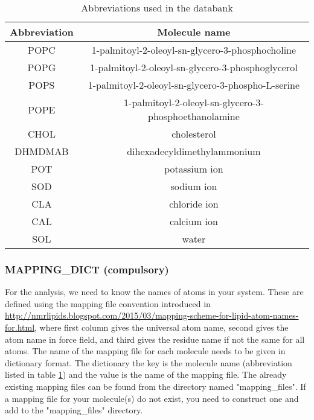\documentclass[fleqn,10pt]{wlscirep}
\begin{document}
\begin{table}[h]
    \centering
    \begin{tabular}{c|c}
        Abbreviation & Molecule name \\
        \hline
        POPC &  1-palmitoyl-2-oleoyl-sn-glycero-3-phosphocholine\\
        POPG &  1-palmitoyl-2-oleoyl-sn-glycero-3-phosphoglycerol \\
        POPS & 1-palmitoyl-2-oleoyl-sn-glycero-3-phospho-L-serine \\
        POPE & 1-palmitoyl-2-oleoyl-sn-glycero-3-phosphoethanolamine \\
        CHOL & cholesterol \\
        DHMDMAB & dihexadecyldimethylammonium \\
        \hline
        POT & potassium ion \\
        SOD & sodium ion \\
        CLA & chloride ion \\
        CAL & calcium ion \\
        SOL & water \\
    \end{tabular}
    \caption{Abbreviations used in the databank}
    \label{tab:abbreviations}
\end{table}

\subsubsection*{MAPPING\_DICT (compulsory)}
For the analysis, we need to know the names of atoms in your system.
These are defined using the mapping file convention introduced in \url{http://nmrlipids.blogspot.com/2015/03/mapping-scheme-for-lipid-atom-names-for.html}, where first column gives the universal atom name, second gives the atom name in force field, and third gives the residue name if not the same for all atoms.
The name of the mapping file for each molecule needs to be given in dictionary format. The dictionary the key is the molecule name (abbreviation listed in table \ref{tab:abbreviations}) and the value is the name of the mapping file. The already existing mapping files can be found from the directory named "mapping\_files". If a mapping file for your molecule(s) do not exist, you need to construct one and add to the "mapping\_files" directory.

\end{document}
